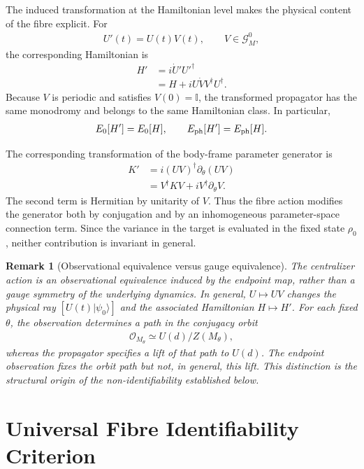 \documentclass[twocolumn,prl,aps,floatfix]{revtex4-2}
\newtheorem{remark}{Remark}
\begin{document}
The induced transformation at the Hamiltonian level makes the physical content of the fibre explicit. For
\begin{align}
U'(t)=U(t)V(t),
\qquad
V\in\mathcal G_M^0,
\end{align}
the corresponding Hamiltonian is
\begin{align}
H'
&=
i\dot U' U'^\dagger
\nonumber\\
&=
H+iU\dot V V^\dagger U^\dagger .
\label{eq:H_transformation}
\end{align}
Because $V$ is periodic and satisfies $V(0)=\mathbb I$, the transformed propagator has the same monodromy and belongs to the same Hamiltonian class. In particular,
\begin{align}
E_0[H']
=
E_0[H],
\qquad
E_{\rm ph}[H']
=
E_{\rm ph}[H].
\end{align}

The corresponding transformation of the body-frame parameter generator is
\begin{align}
K'
&=
i(UV)^\dagger
\partial_\theta(UV)
\nonumber\\
&=
V^\dagger K V
+
iV^\dagger\partial_\theta V .
\label{eq:K_transformation}
\end{align}
The second term is Hermitian by unitarity of $V$. Thus the fibre action modifies the generator both by conjugation and by an inhomogeneous parameter-space connection term. Since the variance in the target is evaluated in the fixed state $\rho_0$, neither contribution is invariant in general.

\begin{remark}[Observational equivalence versus gauge equivalence]
The centralizer action is an observational equivalence induced by the endpoint map, rather than a gauge symmetry of the underlying dynamics. In general, $U\mapsto UV$ changes the physical ray $[U(t)|\psi_0\rangle]$ and the associated Hamiltonian $H\mapsto H'$. For each fixed $\theta$, the observation determines a path in the conjugacy orbit
\begin{align}
\mathcal O_{M_\theta}
\simeq
U(d)/Z(M_\theta),
\end{align}
whereas the propagator specifies a lift of that path to $U(d)$. The endpoint observation fixes the orbit path but not, in general, this lift. This distinction is the structural origin of the non-identifiability established below.
\end{remark}

\section{Universal Fibre Identifiability Criterion}
\end{document}
